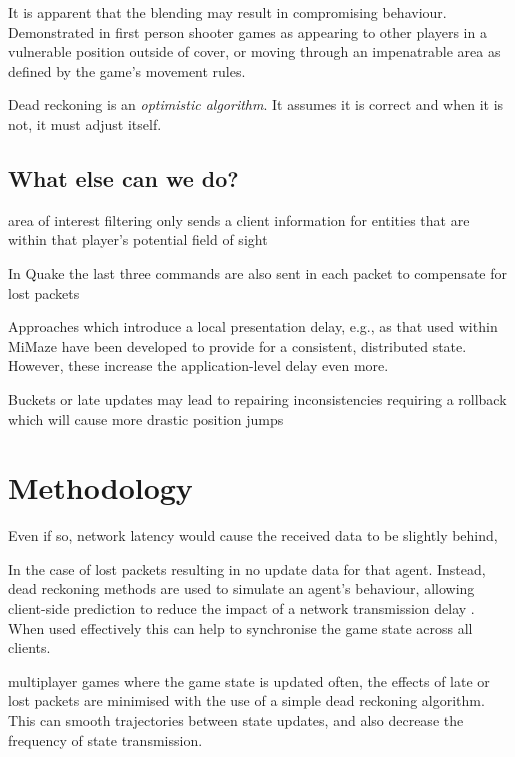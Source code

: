 \documentclass[journal]{IEEEtran}
\begin{document}
It is apparent that the blending may result in compromising behaviour. Demonstrated in first person shooter games as appearing to other players in a vulnerable position outside of cover, or moving through an impenatrable area as defined by the game's movement rules.

Dead reckoning is an \textit{optimistic algorithm}. It assumes it is correct  and when it is not, it must adjust itself.


\subsection{What else can we do?}

area of interest filtering only sends a client information for entities that are within that player’s potential field of sight \cite{cronin2001distributed}

In Quake the last three commands are also sent in each packet to compensate for lost packets \cite{cronin2001distributed}

Approaches which introduce a local presentation delay, e.g., as that used within MiMaze \cite{gautier1998design} have been developed to provide for a consistent, distributed state. However, these increase the application-level delay even more.

Buckets or late updates may lead to repairing inconsistencies requiring a rollback which will cause more drastic position jumps \cite{cronin2002efficient}



\section{Methodology}

Even if so, network latency would cause the received data to be slightly behind, 

In the case of lost packets resulting in no update data for that agent. Instead, dead reckoning methods are used to simulate an agent's behaviour, allowing client-side prediction to reduce the impact of a network transmission delay \cite{pantel2002suitability}. When used effectively this can help to synchronise the game state across all clients.

multiplayer games where the game state is updated often, the effects of late or lost packets are minimised with the use of a simple dead reckoning algorithm. This can smooth trajectories between state updates, and also decrease the frequency of state transmission.
\end{document}
